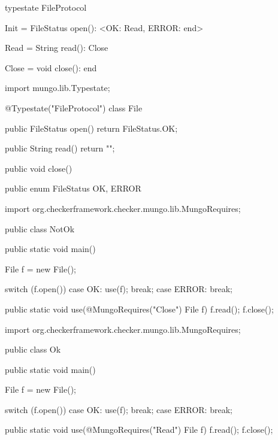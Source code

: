 \begin{code}
typestate FileProtocol {

  Init = {
    FileStatus open(): <OK: Read, ERROR: end>
  }

  Read = {
    String read(): Close
  }

  Close = {
    void close(): end
  }

}\end{code}

\begin{code}
import mungo.lib.Typestate;

@Typestate("FileProtocol")
class File {

  public FileStatus open() {
    return FileStatus.OK;
  }

  public String read() {
    return "";
  }

  public void close() {
  }

}\end{code}

\begin{code}
public enum FileStatus {
  OK, ERROR
}\end{code}

\begin{code}
import org.checkerframework.checker.mungo.lib.MungoRequires;

public class NotOk {

  public static void main() {
    File f = new File();

    switch (f.open()) {
      case OK:
        use(f);
        break;
      case ERROR:
        break;
    }
  }

  public static void use(@MungoRequires("Close") File f) {
    f.read();
    f.close();
  }

}\end{code}

\begin{code}
import org.checkerframework.checker.mungo.lib.MungoRequires;

public class Ok {

  public static void main() {
    File f = new File();

    switch (f.open()) {
      case OK:
        use(f);
        break;
      case ERROR:
        break;
    }
  }

  public static void use(@MungoRequires("Read") File f) {
    f.read();
    f.close();
  }

}\end{code}

